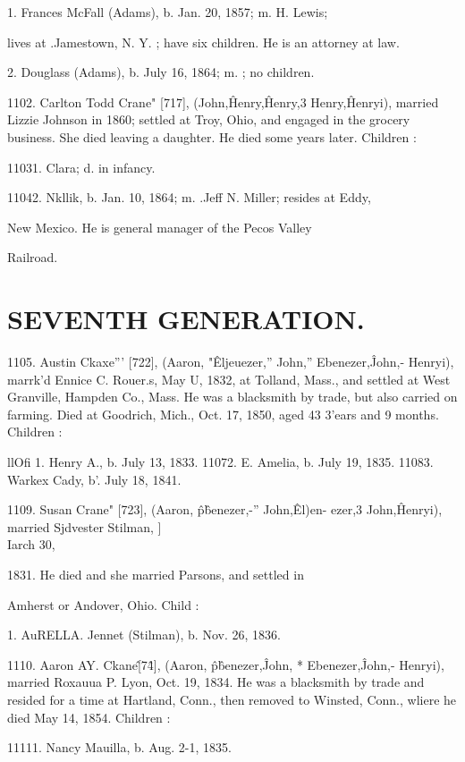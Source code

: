\documentclass{book}
\begin{document}
1. Frances McFall (Adams), b. Jan. 20, 1857; m. H. Lewis; 

lives at .Jamestown, N. Y. ; have six children. He is an 
attorney at law. 

2. Douglass (Adams), b. July 16, 1864; m. ; no children. 

1102. Carlton Todd Crane" [717], (John,\^ Henry,\^ Henry,3 
Henry,\^ Henryi), married Lizzie Johnson in 1860; settled at 
Troy, Ohio, and engaged in the grocery business. She died 
leaving a daughter. He died some years later. Children : 

11031. Clara; d. in infancy. 

11042. Nkllik, b. Jan. 10, 1864; m. .Jeff N. Miller; resides at Eddy, 

New Mexico. He is general manager of the Pecos Valley 

Railroad. 



\section{SEVENTH GENERATION.}


1105. Austin Ckaxe''' [722], (Aaron, "\^ Eljeuezer,'' John,'' 
Ebenezer,\^ John,- Henryi), marrk'd Ennice C. Rouer.s, May U, 
1832, at Tolland, Mass., and settled at West Granville, Hampden 
Co., Mass. He was a blacksmith by trade, but also carried on 
farming. Died at Goodrich, Mich., Oct. 17, 1850, aged 43 3'ears 
and 9 months. Children : 

llOfi 1. Henry A., b. July 13, 1833. 
11072. E. Amelia, b. July 19, 1835. 
11083. Warkex Cady, b'. July 18, 1841. 

1109. Susan Crane" [723], (Aaron, \^ p\^benezer,-'' John,\^ El)en- 
ezer,3 John,\^ Henryi), married Sjdvester Stilman, ]\\Iarch 30, 

1831. He died and she married Parsons, and settled in 

Amherst or Andover, Ohio. Child : 

1. AuRELLA. Jennet (Stilman), b. Nov. 26, 1836. 

1110. Aaron AY. Ckane\^ [7\^4], (Aaron, \^ p\^benezer,\^ John, * 
Ebenezer,\^ John,- Henryi), married Roxauua P. Lyon, Oct. 19, 
1834. He was a blacksmith by trade and resided for a time at 
Hartland, Conn., then removed to Winsted, Conn., wliere he 
died May 14, 1854. Children : 

11111. Nancy Mauilla, b. Aug. 2-1, 1835. 
\end{document}
